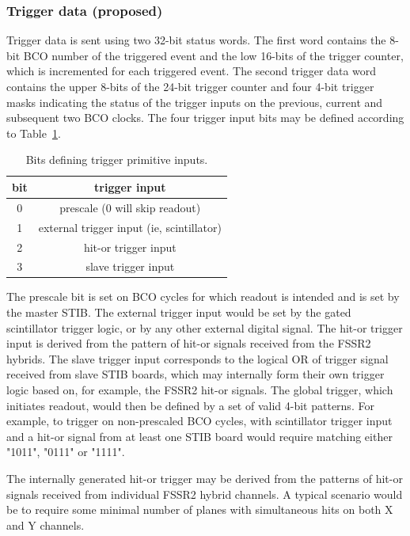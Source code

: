 \documentclass[11pt]{article}
\begin{document}
\subsubsection{Trigger data (proposed)}
Trigger data is sent using two 32-bit status words.  The first word
contains the 8-bit BCO number of the triggered event and the low 16-bits
of the trigger counter, which is incremented for each triggered event.
The second trigger data word contains the upper 8-bits of the 24-bit trigger
counter and four 4-bit trigger masks indicating the status of the trigger
inputs on the previous, current and subsequent two BCO clocks.  The four
trigger input bits may be defined according to Table~\ref{tab-trigprim}.
\begin{table}
  \begin{center}
    \begin{tabular}{|c|c|}\hline
bit & trigger input \\ \hline
0 & prescale (0 will skip readout) \\
1 & external trigger input (ie, scintillator) \\
2 & hit-or trigger input \\
3 & slave trigger input \\ \hline
\end{tabular}
  \end{center}
  \caption{\label{tab-trigprim}Bits defining trigger primitive inputs.}
\end{table}
The prescale bit is set on BCO cycles for which readout is intended and is
set by the master STIB.  The external trigger input would be set by the
gated scintillator trigger logic, or by any other external digital signal.
The hit-or trigger input is derived from the pattern of hit-or signals
received from the FSSR2 hybrids.  The slave trigger input corresponds to
the logical OR of trigger signal received from slave STIB boards, which may
internally form their own trigger logic based on, for example, the FSSR2
hit-or signals.  The global trigger, which initiates readout, would then be
defined by a set of valid 4-bit patterns.  For example, to trigger on
non-prescaled BCO cycles, with scintillator trigger input and a hit-or
signal from at least one STIB board would require matching either "1011",
"0111" or "1111".

The internally generated hit-or trigger may be derived from the patterns
of hit-or signals received from individual FSSR2 hybrid channels.  A typical
scenario would be to require some minimal number of planes with simultaneous
hits on both X and Y channels.
\end{document}
